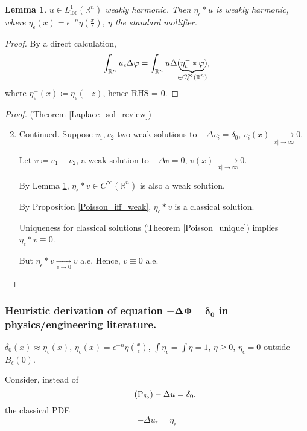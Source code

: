 \documentclass[12pt]{article}
\newtheorem{lemma}{Lemma}[section]
\theoremstyle{definition}
\begin{document}
\begin{lemma}\label{mollified_weak_harmonic}
$u\in L_\text{loc}^1(\mathbb R^n)$ weakly harmonic. Then $\eta_\epsilon*u$ is weakly harmonic, where $\eta_\epsilon(x)=\epsilon^{-n}\eta(\frac x\epsilon)$, $\eta$ the standard mollifier.
\end{lemma}

\begin{proof}
By a direct calculation,
\[\int_{\mathbb R^n}u_\epsilon\Delta\varphi=\int_{\mathbb R^n}u\Delta(\underbrace{\eta_\epsilon^-*\varphi}_{\mathclap{\in C_0^\infty(\mathbb R^n)}}),\]
where $\eta_\epsilon^-(x)\coloneqq\eta_\epsilon(-z)$, hence RHS = 0.
\end{proof}

\begin{proof}
(Theorem \ref{Laplace_sol_review})
\begin{enumerate}[label=\alph*)]
\setcounter{enumi}{1}
\item Continued. Suppose $v_1,v_2$ two weak solutions to $-\Delta v_i=\delta_0$, $v_i(x)\xrightarrow[|x|\to\infty]{}0$.

Let $v\coloneqq v_1-v_2$, a weak solution to $-\Delta v=0$, $v(x)\xrightarrow[|x|\to\infty]{}0$.

By Lemma \ref{mollified_weak_harmonic}, $\eta_\epsilon*v\in C^\infty(\mathbb R^n)$ is also a weak solution.

By Proposition \ref{Poisson_iff_weak}, $\eta_\epsilon*v$ is a classical solution.

Uniqueness for classical solutions (Theorem \ref{Poisson_unique}) implies $\eta_\epsilon*v\equiv0$.

But $\eta_\epsilon*v\xrightarrow[\epsilon\to0]{}v$ a.e. Hence, $v\equiv0$ a.e.
\end{enumerate}
\end{proof}

\subsubsection*{Heuristic derivation of equation $\boldsymbol{-\Delta\Phi=\delta_0}$ in physics/engineering literature.}
$\delta_0(x)\approx\eta_\epsilon(x)$, $\eta_\epsilon(x)=\epsilon^{-n}\eta(\frac x\epsilon)$, $\int\eta_\epsilon=\int\eta=1$, $\eta\geq0$, $\eta_\epsilon=0$ outside $B_\epsilon(0)$.

Consider, instead of
\begin{equation}\tag{P$_{\delta_0}$}\label{Poisson_Dirac_physics}
-\Delta u=\delta_0,
\end{equation}
the classical PDE
\begin{equation}\tag{P$_\epsilon$}\label{Poisson_mollified}
-\Delta u_\epsilon=\eta_\epsilon
\end{equation}
\end{document}

